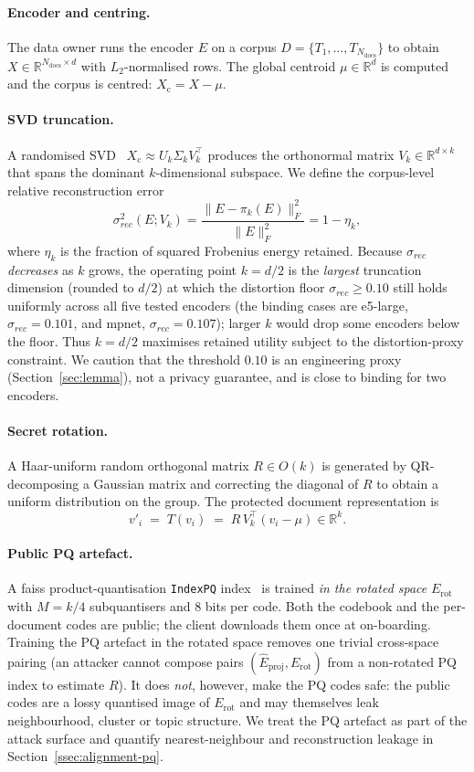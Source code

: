 \paragraph{Encoder and centring.} The data owner runs the encoder $E$ on a
corpus $D = \{T_1, \dots, T_{N_{\mathrm{docs}}}\}$ to obtain
$X \in \mathbb{R}^{N_{\mathrm{docs}} \times d}$ with $L_2$-normalised rows.
The global centroid $\mu \in \mathbb{R}^d$ is computed and the corpus is
centred: $X_{\mathrm{c}} = X - \mu$.

\paragraph{SVD truncation.} A randomised SVD~\cite{ref_halko,ref_eckart}
$X_{\mathrm{c}} \approx U_k \Sigma_k V_k^\top$ produces the orthonormal
matrix $V_k \in \mathbb{R}^{d \times k}$ that spans the dominant
$k$-dimensional subspace. We define the corpus-level relative
reconstruction error
\[
\sigma_{rec}^{2}(E; V_k) =
\frac{\|E - \pi_k(E)\|_F^2}{\|E\|_F^2} = 1 - \eta_k ,
\]
where $\eta_k$ is the fraction of squared Frobenius energy retained.
Because $\sigma_{rec}$ \emph{decreases} as $k$ grows, the operating point
$k = d/2$ is the \emph{largest} truncation dimension (rounded to $d/2$) at
which the distortion floor $\sigma_{rec} \geq 0.10$ still holds uniformly
across all five tested encoders (the binding cases are e5-large,
$\sigma_{rec}=0.101$, and mpnet, $\sigma_{rec}=0.107$); larger $k$ would
drop some encoders below the floor. Thus $k=d/2$ maximises retained
utility subject to the distortion-proxy constraint. We caution that the
threshold $0.10$ is an engineering proxy (Section~\ref{sec:lemma}), not a
privacy guarantee, and is close to binding for two encoders.

\paragraph{Secret rotation.} A Haar-uniform random orthogonal matrix
$R \in O(k)$ is generated by QR-decomposing a Gaussian matrix and
correcting the diagonal of $R$ to obtain a uniform distribution on the
group. The protected document representation is
\[
v'_i \;=\; T(v_i) \;=\; R\, V_k^\top (v_i - \mu) \in \mathbb{R}^k .
\]

\paragraph{Public PQ artefact.} A faiss product-quantisation
\texttt{IndexPQ} index~\cite{ref_pq} is trained
\emph{in the rotated space} $E_{\mathrm{rot}}$ with $M = k/4$ subquantisers
and $8$ bits per code. Both the codebook and the per-document codes are
public; the client downloads them once at on-boarding. Training the PQ
artefact in the rotated space removes one trivial cross-space pairing
(an attacker cannot compose pairs
$(\hat E_{\mathrm{proj}}, E_{\mathrm{rot}})$ from a non-rotated PQ index
to estimate $R$). It does \emph{not}, however, make the PQ codes safe:
the public codes are a lossy quantised image of $E_{\mathrm{rot}}$ and
may themselves leak neighbourhood, cluster or topic structure. We treat
the PQ artefact as part of the attack surface and quantify
nearest-neighbour and reconstruction leakage in
Section~\ref{ssec:alignment-pq}.

